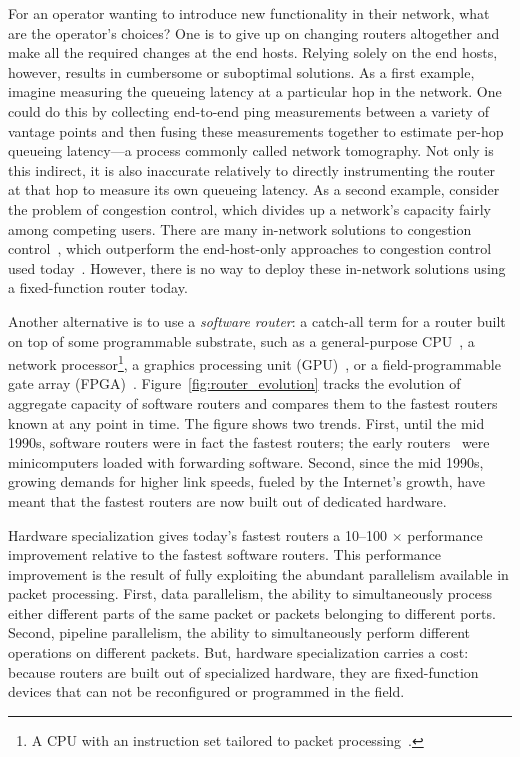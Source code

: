 For an operator wanting to introduce new functionality in their network, what
are the operator's choices? One is to give up on changing routers altogether
and make all the required changes at the end hosts.  Relying solely on the end
hosts, however, results in cumbersome or suboptimal solutions. As a first
example, imagine measuring the queueing latency at a particular hop in the
network. One could do this by collecting end-to-end ping measurements between a
variety of vantage points and then fusing these measurements together to
estimate per-hop queueing latency---a process commonly called network
tomography. Not only is this indirect, it is also inaccurate relatively to
directly instrumenting the router at that hop to measure its own queueing
latency. As a second example, consider the problem of congestion control, which
divides up a network's capacity fairly among competing users. There are many
in-network solutions to congestion control~\cite{xcp, rcp}, which outperform
the end-host-only approaches to congestion control used today~\cite{cubic,
compound}. However, there is no way to deploy these in-network solutions using
a fixed-function router today.

Another alternative is to use a \textit{software router}: a catch-all term for
a router built on top of some programmable substrate, such as a general-purpose
CPU~\cite{click, routebricks}, a network processor\footnote{A CPU with an
instruction set tailored to packet processing~\cite{ixp4xx, ixp2800}.}, a
graphics processing unit (GPU)~\cite{packetshader}, or a field-programmable
gate array (FPGA)~\cite{netfpga}.  Figure~\ref{fig:router_evolution} tracks the
evolution of aggregate capacity of software routers and compares them to the
fastest routers known at any point in time. The figure shows two trends.
First, until the mid 1990s, software routers were in fact the fastest routers;
the early routers~\cite{imp} were minicomputers loaded with forwarding
software. Second, since the mid 1990s, growing demands for higher link speeds,
fueled by the Internet's growth, have meant that the fastest routers are now
built out of dedicated hardware.

Hardware specialization gives today's fastest routers a 10--100 $\times$ performance
improvement relative to the fastest software routers.  This performance improvement is the
result of fully exploiting the abundant parallelism available in packet
processing. First, data parallelism, the ability to simultaneously process
either different parts of the same packet or packets belonging to different
ports. Second, pipeline parallelism, the ability to simultaneously perform
different operations on different packets. But, hardware specialization carries
a cost: because routers are built out of specialized hardware, they are
fixed-function devices that can not be reconfigured or programmed in the field.

